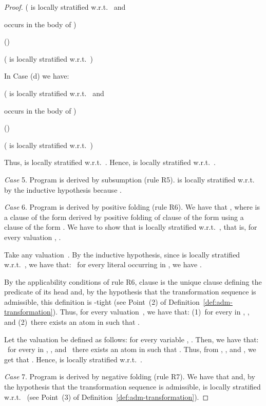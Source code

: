 \documentclass[english]{tlp}
\begin{document}
\begin{proof}
\smallskip

\makebox[1.4cm][l]{} \makebox[3cm][l]{} ( is locally stratified w.r.t.~ and

\makebox[48mm][l]{}
 occurs in the body of )

\hspace*{1.4cm} \makebox[3cm][l]{}
()

\hspace*{1.4cm} \makebox[3cm][l]{} (
is locally stratified w.r.t.~)

\smallskip

\noindent In Case (d) we have:
\smallskip

\makebox[1.4cm][l]{} \makebox[3cm][l]{} ( is locally stratified
w.r.t.~ and 

\makebox[48mm][l]{}
 occurs in the body of )

\hspace*{1.4cm} \makebox[3cm][l]{}
()

\hspace*{1.4cm} \makebox[3cm][l]{}
( is locally stratified w.r.t.~)

\smallskip

\noindent Thus,  is locally stratified w.r.t.~. Hence,  is locally stratified w.r.t.~.

\medskip

\noindent \emph{Case} 5. Program  is derived by
subsumption (rule R5).  is locally stratified w.r.t.~ by the inductive hypothesis because . 


\medskip

\noindent \emph{Case} 6. Program  is derived by
positive folding (rule R6). We have that , where  is a clause of the form  derived by positive
folding of clause  of the form  using a clause  of the form . We have to show that 
is locally stratified w.r.t.~, that is, for every valuation
, . 

Take any
valuation~. 
By the inductive hypothesis, since  is locally stratified 
w.r.t.~, we have that: ~for every literal 
occurring in , we have . 

By the applicability conditions of rule R6, clause
 is the unique clause defining the predicate of its head and, by the
hypothesis that the transformation sequence is admissible, this
definition is -tight (see Point~(2) of
Definition~\ref{def:adm-transformation}). Thus, for every
valuation~, we have that: (1)~for every  in , 
,
and (2)~there exists an atom  in  such that 
. 


Let the valuation  be defined as follows: for every variable ,
. Then, we have that: 
~for every  in , ,
and ~there exists an atom  in  such that 
. 
Thus, from , , and , we get that
. Hence,  is locally stratified
w.r.t.~.

\medskip

\noindent \emph{Case} 7. Program  is derived by
negative folding (rule R7). We have that  and, by the hypothesis that the transformation
sequence is admissible,  is locally stratified
w.r.t.~ (see Point~(3) of
Definition~\ref{def:adm-transformation}).
\end{proof}
\end{document}
